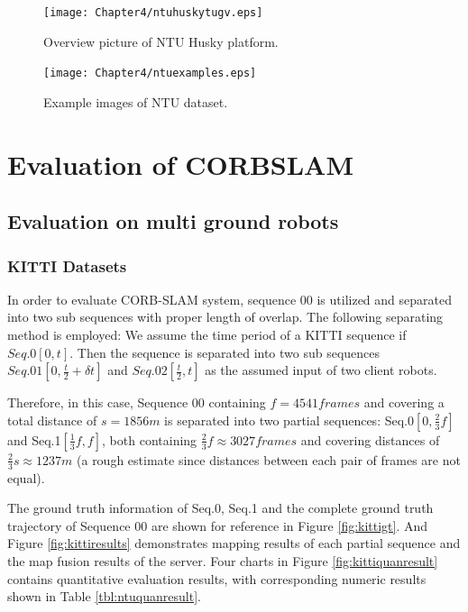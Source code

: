 \begin{figure}[H]
	\centering
	\texttt{[image: Chapter4/ntuhuskytugv.eps]}
	\caption{Overview picture of NTU Husky platform.}
	\label{fig:ntuugvplatform} 
\end{figure}


\begin{figure}[H]
	\centering
	\texttt{[image: Chapter4/ntuexamples.eps]}
	\caption{Example images of NTU dataset.}
	\label{fig:ntuexamples} 
\end{figure}

\section{Evaluation of CORBSLAM}
\subsection{Evaluation on multi ground robots}

\subsubsection{KITTI Datasets}
\label{sec:kittievaluate}
In order to evaluate CORB-SLAM system, sequence 00 is utilized and separated into two sub sequences with proper length of overlap. The following separating method is employed: We assume the time period of a KITTI sequence if $Seq.0[0,t]$. Then the sequence is separated into two sub sequences $Seq.01[0,\frac{t}{2}+\delta{t}]$ and $Seq.02[\frac{t}{2},t]$ as the assumed input of two client robots. 

Therefore, in this case, Sequence 00 containing $f=4541frames$ and covering a total distance of $s=1856m$ is separated into two partial sequences: Seq.0$[0, \frac{2}{3}f]$ and Seq.1$[\frac{1}{3}f, f]$, both containing  $\frac{2}{3}f\approx{3027frames}$ and covering distances of $\frac{2}{3}s\approx{1237m}$ (a rough estimate since distances between each pair of frames are not equal). 

The ground truth information of Seq.0, Seq.1 and the complete ground truth trajectory of Sequence 00 are shown for reference in Figure \ref{fig:kittigt}. And Figure \ref{fig:kittiresults} demonstrates mapping results of each partial sequence and the map fusion results of the server. Four charts in Figure \ref{fig:kittiquanresult} contains quantitative evaluation results, with corresponding numeric results shown in Table \ref{tbl:ntuquanresult}.

